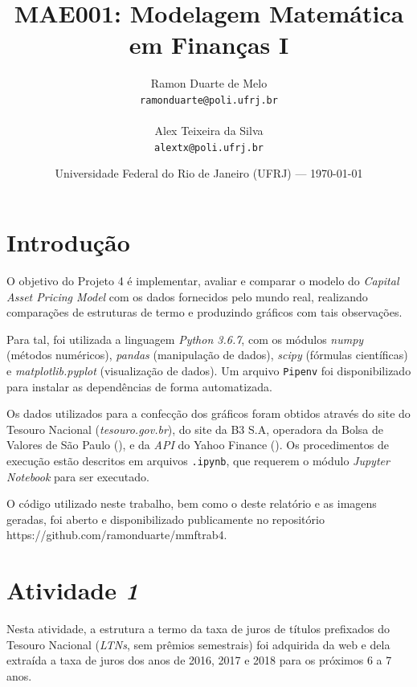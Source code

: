 \documentclass{article}
\title{MAE001: Modelagem Matemática em Finanças I} %
\date{Universidade Federal do Rio de Janeiro (UFRJ) --- \today} %
\author{Ramon Duarte de Melo\\ \texttt{ramonduarte@poli.ufrj.br} %
\\ \\ Alex Teixeira da Silva\\ \texttt{alextx@poli.ufrj.br}} %
\begin{document}
\maketitle %


\section*{Introdução} %

O objetivo do Projeto 4 é implementar, avaliar e comparar o modelo do \emph{Capital Asset Pricing Model} com os dados fornecidos pelo mundo real, realizando comparações de estruturas de termo e produzindo gráficos com tais observações. 

Para tal, foi utilizada a linguagem \emph{Python 3.6.7}, com os módulos \emph{numpy} (métodos numéricos), \emph{pandas} (manipulação de dados), \emph{scipy} (fórmulas científicas) e \emph{matplotlib.pyplot} (visualização de dados). Um arquivo \texttt{Pipenv} foi disponibilizado para instalar as dependências de forma automatizada.

Os dados utilizados para a confecção dos gráficos foram obtidos através do site do Tesouro Nacional (\textsl{tesouro.gov.br}), do site da B3 S.A, operadora da Bolsa de Valores de São Paulo (\textsf{}), e da \emph{API} do Yahoo Finance (\textsl{}). Os procedimentos de execução estão descritos em arquivos \texttt{.ipynb}, que requerem o módulo \emph{Jupyter Notebook} para ser executado.


O código utilizado neste trabalho, bem como o deste relatório e as imagens geradas, foi aberto e disponibilizado publicamente no repositório https://github.com/ramonduarte/mmftrab4.



\section*{Atividade \emph{1}} %

Nesta atividade, a estrutura a termo da taxa de juros de títulos prefixados do Tesouro Nacional (\emph{LTNs}, sem prêmios semestrais) foi adquirida da web e dela extraída a taxa de juros dos anos de 2016, 2017 e 2018 para os próximos 6 a 7 anos.
\end{document}
